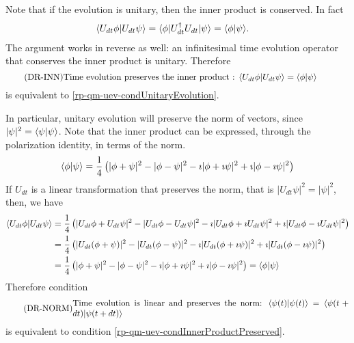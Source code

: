 Note that if the evolution is unitary, then the inner product is conserved. In fact
\begin{equation}
	\begin{aligned}
		\langle U_{dt} \phi | U_{dt} \psi\rangle &= \langle \phi | U^\dagger_{dt} U_{dt} | \psi \rangle =\langle  \phi | \psi \rangle.
	\end{aligned}
\end{equation}
The argument works in reverse as well: an infinitesimal time evolution operator that conserves the inner product is unitary. Therefore
\begin{equation}\label{rp-qm-uev-condInnerProductPreserved}
	\tag{DR-INN}
	\eqtext{Time evolution preserves the inner product : $\< U_{dt} \phi | U_{dt} \psi\> =\<  \phi | \psi \>$} 
\end{equation}
is equivalent to \ref{rp-qm-uev-condUnitaryEvolution}.

In particular, unitary evolution will preserve the norm of vectors, since $|\psi|^2 = \langle\psi | \psi \rangle$. Note that the inner product can be expressed, through the polarization identity, in terms of the norm.
\begin{equation}
	\begin{aligned}
		\langle \phi | \psi \rangle = \frac{1}{4}\left( |\phi + \psi|^2 - |\phi - \psi|^2 - \imath |\phi + \imath \psi|^2 +\imath |\phi - \imath \psi|^2 \right)
	\end{aligned}
\end{equation}
If $U_{dt}$ is a linear transformation that preserves the norm, that is $|U_{dt} \psi | ^2 = | \psi |^2$, then, we have
\begin{equation}
	\begin{aligned}
		\langle U_{dt} \phi | U_{dt} \psi \rangle &= \frac{1}{4}\left( |U_{dt}\phi + U_{dt}\psi|^2 - |U_{dt}\phi - U_{dt}\psi|^2 - \imath |U_{dt}\phi + \imath U_{dt}\psi|^2 +\imath |U_{dt}\phi - \imath U_{dt}\psi|^2 \right) \\
		&= \frac{1}{4}\left( |U_{dt}(\phi + \psi)|^2 - |U_{dt}(\phi - \psi)|^2 - \imath |U_{dt}(\phi + \imath \psi)|^2 +\imath |U_{dt}(\phi - \imath \psi)|^2 \right) \\
		&= \frac{1}{4}\left( |\phi + \psi|^2 - |\phi - \psi|^2 - \imath |\phi + \imath \psi|^2 +\imath |\phi - \imath \psi|^2 \right) =  \langle \phi | \psi \rangle 
	\end{aligned}
\end{equation}
Therefore condition
\begin{equation}\label{rp-qm-uev-condNormalized}
	\tag{DR-NORM}
	\eqtext{Time evolution is linear and preserves the norm: $\< \psi(t) | \psi(t) \> = \< \psi(t+dt) | \psi(t+dt) \>$} 
\end{equation}
is equivalent to condition \ref{rp-qm-uev-condInnerProductPreserved}.

